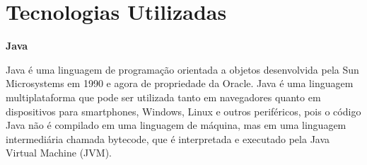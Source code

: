 \section{Tecnologias Utilizadas} 
	\textbf{Java}
	
	Java é uma linguagem de programação orientada a objetos desenvolvida pela Sun Microsystems em 1990 e agora de propriedade da Oracle. Java é uma linguagem multiplataforma que pode ser utilizada tanto em navegadores quanto em dispositivos para smartphones, Windows, Linux e outros periféricos, pois o código Java não é compilado em uma linguagem de máquina, mas em uma linguagem intermediária chamada bytecode, que é interpretada e executado pela Java Virtual Machine (JVM).
	

